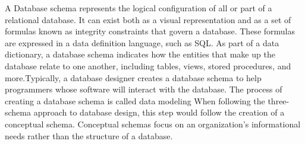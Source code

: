 \documentclass[12pt,a4paper]{article}
\newcommand\tab[1][1cm]{\hspace*{#1}}
\begin{document}
		\tab A Database schema \cite{Ref:16} represents the logical configuration of all or part of a relational database. It can exist both as a visual representation and as a set of formulas known as integrity constraints that govern a database. These formulas are expressed in a data definition language, such as SQL. As part of a data dictionary, a database schema indicates how the entities that make up the database relate to one another, including tables, views, stored procedures, and more.Typically, a database designer creates a database schema to help programmers whose software will interact with the database. The process of creating a database schema is called data modeling When following the three-schema approach to database design, this step would follow the creation of a conceptual schema. Conceptual schemas focus on an organization’s informational needs rather than the structure of a database.
		\newpage
\end{document}
